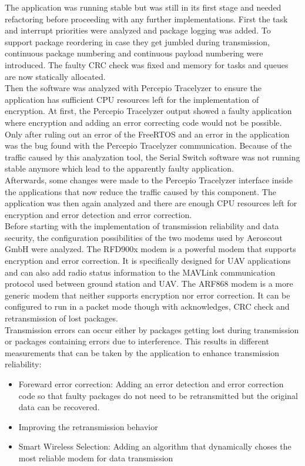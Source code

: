 The application was running stable but was still in its first stage and needed refactoring before proceeding with any further implementations. First the task and interrupt priorities were analyzed and package logging was added. To support package reordering in case they get jumbled during transmission, continuous package numbering and continuous payload numbering were introduced. The faulty CRC check was fixed and memory for tasks and queues are now statically allocated.\\
Then the software was analyzed with Percepio Tracelyzer to ensure the application has sufficient CPU resources left for the implementation of encryption. At first, the Percepio Tracelyzer output showed a faulty application where encryption and adding an error correcting code would not be possible. Only after ruling out an error of the FreeRTOS and an error in the application was the bug found with the Percepio Tracelyzer communication. Because of the traffic caused by this analyzation tool, the Serial Switch software was not running stable anymore which lead to the apparently faulty application.\\
Afterwards, some changes were made to the Percepio Tracelyzer interface inside the applications that now reduce the traffic caused by this component. The application was then again analyzed and there are enough CPU resources left for encryption and error detection and error correction.\\
Before starting with the implementation of transmission reliability and data security, the configuration possibilities of the two modems used by Aeroscout GmbH were analyzed. The RFD900x modem is a powerful modem that supports encryption and error correction. It is specifically designed for UAV applications and can also add radio status information to the MAVLink communication protocol used between ground station and UAV. The ARF868 modem is a more generic modem that neither supports encryption nor error correction. It can be configured to run in a packet mode though with acknowledges, CRC check and retransmission of lost packages.\\
Transmission errors can occur either by packages getting lost during transmission or packages containing errors due to interference. This results in different measurements that can be taken by the application to enhance transmission reliability: 
\begin{itemize}
    \item Foreward error correction: Adding an error detection and error correction code so that faulty packages do not need to be retransmitted but the original data can be recovered.
    \item Improving the retransmission behavior
    \item Smart Wireless Selection: Adding an algorithm that dynamically choses the most reliable modem for data transmission
\end{itemize}
